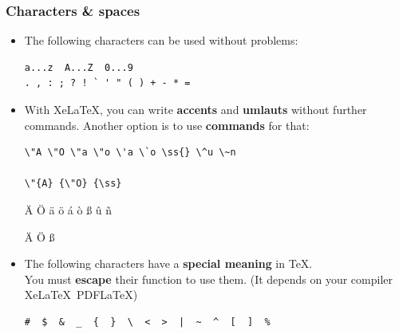 \begin{frame}[fragile]
\frametitle{Characters \& spaces}

\begin{itemize}
	
	\item The following characters can be used without problems:

\begin{lstlisting}
a...z  A...Z  0...9
. , : ; ? ! ` ' " ( ) + - * =
\end{lstlisting}



\pause 

	\item With Xe\LaTeX , you can write \textbf{accents} and \textbf{umlauts} without further commands. Another option is to use \textbf{commands} for that:

\begin{lstlisting}
\"A \"O \"a \"o \'a \`o \ss{} \^u \~n

\"{A} {\"O} {\ss} 
\end{lstlisting}

	\ea \"A \"O \"a \"o \'a \`o \ss{} \^u \~n 
	
	\"{A} {\"O}  {\ss}
	\z 

\pause

	\item The following characters have a \textbf{special meaning} in \TeX . \\
	You must \textbf{escape} their function to use them. (It depends on your compiler \fe Xe\LaTeX\ \vs PDF\LaTeX )

\begin{lstlisting}
#  $  &  _  {  }  \  <  >  |  ~  ^  [  ]  % 
\end{lstlisting}

\end{itemize}

\end{frame}


